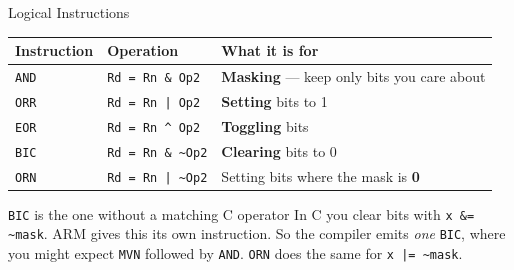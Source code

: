 \documentclass[9pt,aspectratio=169,xcolor=table]{beamer}
\begin{document}
\begin{frame}{Logical Instructions}
    \begin{center}
    {\small
    \striped
    \begin{tabular}{@{}l l l@{}}
        \toprule
        \textbf{Instruction} & \textbf{Operation} & \textbf{What it is for} \\
        \midrule
        \texttt{AND} & \texttt{Rd = Rn \& Op2}                & \textbf{Masking} --- keep only bits you care about \\
        \texttt{ORR} & \texttt{Rd = Rn | Op2}                 & \textbf{Setting} bits to 1 \\
        \texttt{EOR} & \texttt{Rd = Rn \^{} Op2}              & \textbf{Toggling} bits \\
        \texttt{BIC} & \texttt{Rd = Rn \& \textasciitilde Op2}& \textbf{Clearing} bits to 0 \\
        \texttt{ORN} & \texttt{Rd = Rn | \textasciitilde Op2}& Setting bits where the mask is \textbf{0} \\
        \bottomrule
    \end{tabular}}
    \end{center}

    \vspace{3mm}
    \begin{block}{\texttt{BIC} is the one without a matching C operator}
        In C you clear bits with \texttt{x \&= \textasciitilde mask}.
        ARM gives this its own instruction. So the compiler emits
        \emph{one} \texttt{BIC}, where you might expect \texttt{MVN}
        followed by \texttt{AND}. \texttt{ORN} does the same for \texttt{x |= \textasciitilde mask}.
    \end{block}
\end{frame}
\end{document}
